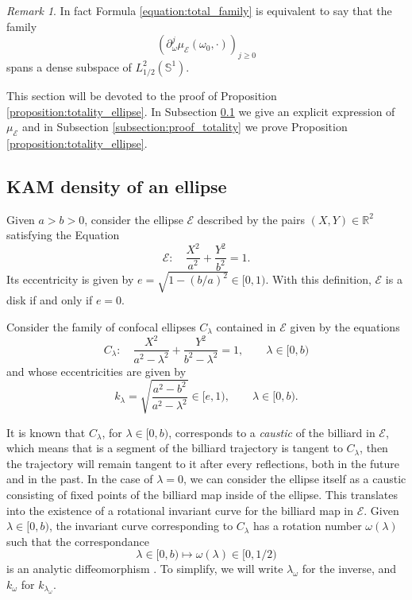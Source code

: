 \documentclass[12pt, openany]{amsart}
\theoremstyle{definition}
\theoremstyle{remark}
\theoremstyle{remark}
\newtheorem{remark}[theorem]{Remark}
\theoremstyle{theorem}
\theoremstyle{theorem}
\theoremstyle{theorem}
\theoremstyle{theorem}
\newcommand{\RR}{\mathbb{R}}
\renewcommand{\SS}{\mathbb{S}}
\begin{document}
\medskip



\begin{remark}
In fact Formula \eqref{equation:total_family} is equivalent to say that the family
\[
\left(\partial_{\omega}^{j}\mu_{\mathscr E}(\omega_0,\cdot)\right)_{j\geq 0}
\]
spans a dense subspace of $L^2_{1/2}(\SS^1)$. 
\end{remark}


This section will be devoted to the proof of Proposition \ref{proposition:totality_ellipse}. {In Subsection \ref{subsection:KAM_density_ellipse} we give an explicit expression of $\mu_{\mathscr E}$ and in Subsection \ref{subsection:proof_totality} we prove Proposition \ref{proposition:totality_ellipse}.}

\subsection{KAM density of an ellipse}
\label{subsection:KAM_density_ellipse}

Given $a>b>0$, consider the ellipse $\mathscr E$ described by the pairs $(X,Y)\in\RR^2$ satisfying the Equation
\[
\mathscr E:\quad \frac{X^2}{a^2}+\frac{Y^2}{b^2}=1.
\]
Its eccentricity is given by $e = \sqrt{1-(b/a)^2}\in[0,1)$. With this definition, $\mathscr E$ is a disk if and only if $e=0$.

Consider the family of confocal ellipses $C_\lambda$ {contained in $\mathscr E$} given by the equations
\[
C_{\lambda}:\quad \frac{X^2}{a^2-\lambda^2}+\frac{Y^2}{b^2-\lambda^2}=1,
\qquad\lambda\in[0,b)
\]
and whose eccentricities are given by
\[
k_{\lambda} = \sqrt{\frac{a^2-b^2}{a^2-\lambda^2}}\in [e,1),
\qquad\lambda\in [0,b).
\]


It is known \cite{FKS} that $C_{\lambda}$, for $\lambda\in[0,b)$, corresponds to a \textit{caustic} of the billiard in $\mathscr E$, which means that is a segment of the  billiard trajectory  is tangent to $C_{\lambda}$, then the trajectory will remain tangent to it after every reflections, both in the future and in the past. In the case of $\lambda=0$, we can consider the ellipse itself as a caustic consisting of fixed points of the billiard map inside of the ellipse. This translates into the existence of a rotational invariant curve for the billiard map in $\mathscr E$. Given $\lambda\in[0,b)$, the invariant curve corresponding to $C_{\lambda}$ has a rotation number $\omega(\lambda)$ such that the correspondance
\[
\lambda\in[0,b)\mapsto\omega(\lambda)\in[0,1/2)
\]
is an analytic diffeomorphism \cite{KS}. To simplify, we will write $\lambda_{\omega}$ for the inverse, and $k_{\omega}$ for $k_{\lambda_{\omega}}$.
\end{document}
